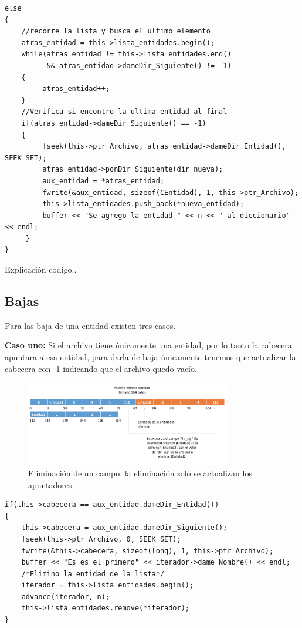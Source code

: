 \begin{lstlisting}[frame=single]
else
{
	//recorre la lista y busca el ultimo elemento
    atras_entidad = this->lista_entidades.begin();
    while(atras_entidad != this->lista_entidades.end()
          && atras_entidad->dameDir_Siguiente() != -1)
    {
         atras_entidad++;
    }
    //Verifica si encontro la ultima entidad al final
    if(atras_entidad->dameDir_Siguiente() == -1)
    {
         fseek(this->ptr_Archivo, atras_entidad->dameDir_Entidad(), SEEK_SET);
         atras_entidad->ponDir_Siguiente(dir_nueva);
         aux_entidad = *atras_entidad;
         fwrite(&aux_entidad, sizeof(CEntidad), 1, this->ptr_Archivo);
         this->lista_entidades.push_back(*nueva_entidad);
         buffer << "Se agrego la entidad " << n << " al diccionario" << endl;
     }
}
\end{lstlisting}

Explicación codigo..

\newpage
\subsection{Bajas}

Para las baja de una entidad existen tres casos.

{\bf Caso uno:} Si el archivo tiene únicamente una entidad, por lo tanto la cabecera apuntara a esa entidad, para darla de baja únicamente tenemos que actualizar la cabecera con -1 indicando que el archivo quedo vacío.

\begin{figure}[!ht]
\begin{center}
  \includegraphics[width=0.8\textwidth]{secciones/ejemploA/Elimina1.png}
  \caption{Eliminación de un campo, la eliminación solo se actualizan los apuntadores.}
\end{center}
\end{figure}

\begin{lstlisting}[frame=single]
if(this->cabecera == aux_entidad.dameDir_Entidad())
{
	this->cabecera = aux_entidad.dameDir_Siguiente();
    fseek(this->ptr_Archivo, 0, SEEK_SET);
    fwrite(&this->cabecera, sizeof(long), 1, this->ptr_Archivo);
    buffer << "Es es el primero" << iterador->dame_Nombre() << endl;
    /*Elimino la entidad de la lista*/
   	iterador = this->lista_entidades.begin();
   	advance(iterador, n);
  	this->lista_entidades.remove(*iterador);
}
\end{lstlisting}

